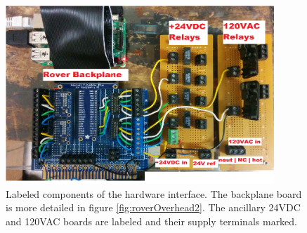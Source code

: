 \documentclass{article}
\begin{document}
\begin{figure}
\centering
\includegraphics[width=0.9\textwidth]{roverOverhead.png}
\caption{Labeled components of the hardware interface. The backplane board is more detailed in figure \ref{fig:roverOverhead2}. The ancillary 24VDC and 120VAC boards are labeled and their supply terminals marked.}
\label{fig:roverOverhead}
\end{figure}
\end{document}

